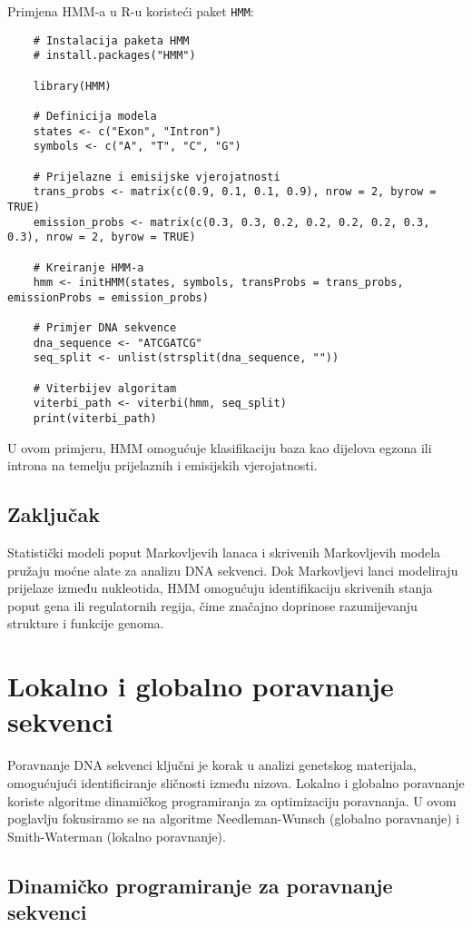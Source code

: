 \documentclass[10pt,a4paper,twoside]{article}
\begin{document}
Primjena HMM-a u R-u koristeći paket \texttt{HMM}:
\begin{verbatim}
	# Instalacija paketa HMM
	# install.packages("HMM")
	
	library(HMM)
	
	# Definicija modela
	states <- c("Exon", "Intron")
	symbols <- c("A", "T", "C", "G")
	
	# Prijelazne i emisijske vjerojatnosti
	trans_probs <- matrix(c(0.9, 0.1, 0.1, 0.9), nrow = 2, byrow = TRUE)
	emission_probs <- matrix(c(0.3, 0.3, 0.2, 0.2, 0.2, 0.2, 0.3, 0.3), nrow = 2, byrow = TRUE)
	
	# Kreiranje HMM-a
	hmm <- initHMM(states, symbols, transProbs = trans_probs, emissionProbs = emission_probs)
	
	# Primjer DNA sekvence
	dna_sequence <- "ATCGATCG"
	seq_split <- unlist(strsplit(dna_sequence, ""))
	
	# Viterbijev algoritam
	viterbi_path <- viterbi(hmm, seq_split)
	print(viterbi_path)
\end{verbatim}

U ovom primjeru, HMM omogućuje klasifikaciju baza kao dijelova egzona ili introna na temelju prijelaznih i emisijskih vjerojatnosti.

\subsection*{Zaključak}

Statistički modeli poput Markovljevih lanaca i skrivenih Markovljevih modela pružaju moćne alate za analizu DNA sekvenci. Dok Markovljevi lanci modeliraju prijelaze između nukleotida, HMM omogućuju identifikaciju skrivenih stanja poput gena ili regulatornih regija, čime značajno doprinose razumijevanju strukture i funkcije genoma.
	
	
\section*{Lokalno i globalno poravnanje sekvenci}

Poravnanje DNA sekvenci ključni je korak u analizi genetskog materijala, omogućujući identificiranje sličnosti između nizova. Lokalno i globalno poravnanje koriste algoritme dinamičkog programiranja za optimizaciju poravnanja. U ovom poglavlju fokusiramo se na algoritme Needleman-Wunsch (globalno poravnanje) i Smith-Waterman (lokalno poravnanje).

\subsection*{Dinamičko programiranje za poravnanje sekvenci}
\end{document}
